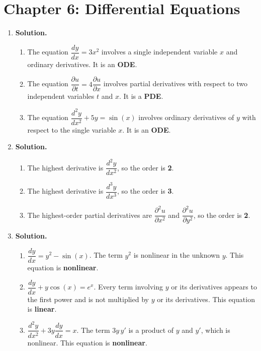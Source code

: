 \chapter{Chapter 6: Differential Equations}

\begin{enumerate}

\item \textbf{Solution.}
\begin{enumerate}
\item The equation $\dfrac{dy}{dx}=3x^2$ involves a single independent variable $x$ and ordinary derivatives. It is an \textbf{ODE}.
\item The equation $\dfrac{\partial u}{\partial t}=4\dfrac{\partial u}{\partial x}$ involves partial derivatives with respect to two independent variables $t$ and $x$. It is a \textbf{PDE}.
\item The equation $\dfrac{d^2y}{dx^2}+5y=\sin(x)$ involves ordinary derivatives of $y$ with respect to the single variable $x$. It is an \textbf{ODE}.
\end{enumerate}

\item \textbf{Solution.}
\begin{enumerate}
\item The highest derivative is $\dfrac{d^2y}{dx^2}$, so the order is \textbf{2}.
\item The highest derivative is $\dfrac{d^3y}{dx^3}$, so the order is \textbf{3}.
\item The highest-order partial derivatives are $\dfrac{\partial^2 u}{\partial x^2}$ and $\dfrac{\partial^2 u}{\partial y^2}$, so the order is \textbf{2}.
\end{enumerate}

\item \textbf{Solution.}
\begin{enumerate}
\item $\dfrac{dy}{dx}=y^2-\sin(x)$. The term $y^2$ is nonlinear in the unknown $y$. This equation is \textbf{nonlinear}.
\item $\dfrac{dy}{dx}+y\cos(x)=e^x$. Every term involving $y$ or its derivatives appears to the first power and is not multiplied by $y$ or its derivatives. This equation is \textbf{linear}.
\item $\dfrac{d^2y}{dx^2}+3y\dfrac{dy}{dx}=x$. The term $3y\,y'$ is a product of $y$ and $y'$, which is nonlinear. This equation is \textbf{nonlinear}.
\end{enumerate}


\end{enumerate}
